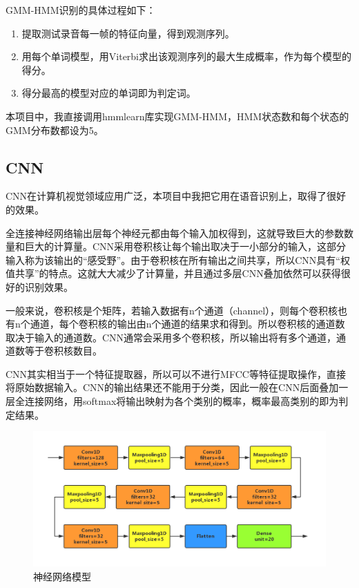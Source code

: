 \documentclass[UTF8]{article}
\begin{document}
GMM-HMM识别的具体过程如下：
\begin{enumerate}
	\item 提取测试录音每一帧的特征向量，得到观测序列。
	\item 用每个单词模型，用Viterbi求出该观测序列的最大生成概率，作为每个模型的得分。
	\item 得分最高的模型对应的单词即为判定词。
\end{enumerate}

本项目中，我直接调用hmmlearn库实现GMM-HMM，HMM状态数和每个状态的GMM分布数都设为5。

\subsection{CNN}
CNN在计算机视觉领域应用广泛，本项目中我把它用在语音识别上，取得了很好的效果。

全连接神经网络输出层每个神经元都由每个输入加权得到，这就导致巨大的参数数量和巨大的计算量。CNN采用卷积核让每个输出取决于一小部分的输入，这部分输入称为该输出的``感受野''。由于卷积核在所有输出之间共享，所以CNN具有``权值共享''的特点。这就大大减少了计算量，并且通过多层CNN叠加依然可以获得很好的识别效果。

一般来说，卷积核是个矩阵，若输入数据有n个通道（channel），则每个卷积核也有n个通道，每个卷积核的输出由n个通道的结果求和得到。所以卷积核的通道数取决于输入的通道数。CNN通常会采用多个卷积核，所以输出将有多个通道，通道数等于卷积核数目。

CNN其实相当于一个特征提取器，所以可以不进行MFCC等特征提取操作，直接将原始数据输入。CNN的输出结果还不能用于分类，因此一般在CNN后面叠加一层全连接网络，用softmax将输出映射为各个类别的概率，概率最高类别的即为判定结果。

\begin{figure}[H]
	\centering
	\includegraphics[width=\textwidth, trim=50 50 50 25, clip]{img/CNN.png}
	\caption{神经网络模型}
	\label{fig:CNN}
\end{figure}
\end{document}
